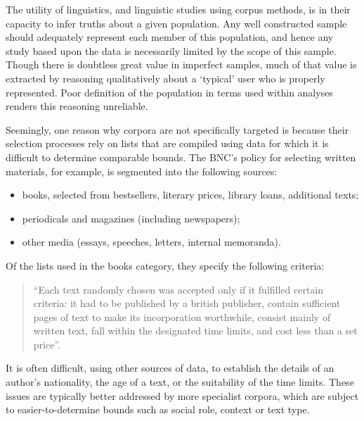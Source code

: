 The utility of linguistics, and linguistic studies using corpus methods, is in their capacity to infer truths about a given population. Any well constructed sample should adequately represent each member of this population, and hence any study based upon the data is necessarily limited by the scope of this sample. Though there is doubtless great value in imperfect samples, much of that value is extracted by reasoning qualitatively about a `typical' user who is properly represented. Poor definition of the population in terms used within analyses renders this reasoning unreliable.

Seemingly, one reason why corpora are not specifically targeted is because their selection processes rely on lists that are compiled using data for which it is difficult to determine comparable bounds.  The BNC's policy for selecting written materials, for example, is segmented into the following sources:

\begin{itemize}
 \item books, selected from bestsellers, literary prices, library loans, additional texts;
 \item periodicals and magazines (including newspapers);
 \item other media (essays, speeches, letters, internal memoranda).
\end{itemize}

Of the lists used in the books category, they specify the following criteria:

\begin{quote}
``Each text randomly chosen was accepted only if it fulfilled certain criteria: it had to be published by a british publisher, contain sufficient pages of text to make its incorporation worthwhile, consist mainly of written text, fall within the designated time limits, and cost less than a set price''.
\end{quote}

It is often difficult, using other sources of data, to establish the details of an author's nationality, the age of a text, or the suitability of the time limits\cite{dollinger2006oh}.
These issues are typically better addressed by more specialist corpora, which are subject to easier-to-determine bounds such as social role, context or text type\cite{kucera2002czech,przepiorkowski2008towards,kyto1993manual}.

